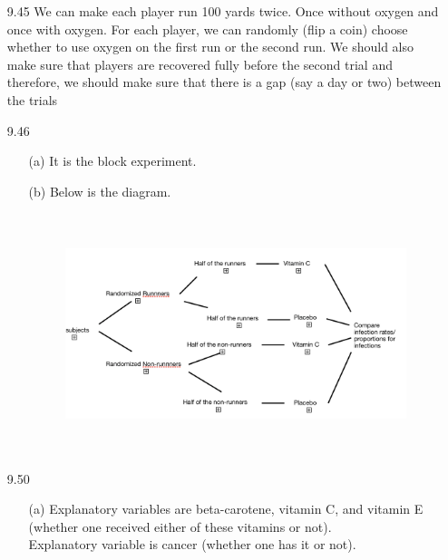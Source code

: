 \documentclass[11pt, a4paper]{article}
\begin{document}
\begin{itemize}
\item[]
\item[]

\item[9.45]
We can make each player run 100 yards twice. Once without oxygen and once with oxygen.
For each player, we can randomly (flip a coin) choose whether to use oxygen on the first
run or the second run. We should also make sure that players are recovered fully
before the second trial and therefore, we should make sure that there is a gap (say a day or two)
between the trials

\item[]
\item[]

\item[9.46]
\begin{itemize}
\item[(a)]
It is the block experiment.

\item[]

\item[(b)]
Below is the diagram.
\begin{figure}[h]
    \centering
    \includegraphics[width=15cm, height=7cm]{diagram_0}
\end{figure}
\end{itemize}

\newpage

\item[9.50]
\begin{itemize}
\item[(a)]
Explanatory variables are beta-carotene, vitamin C, and vitamin E (whether one received either of these vitamins or not).\\
Explanatory variable is cancer (whether one has it or not).

\item[]


\end{itemize}
\end{itemize}
\end{document}
